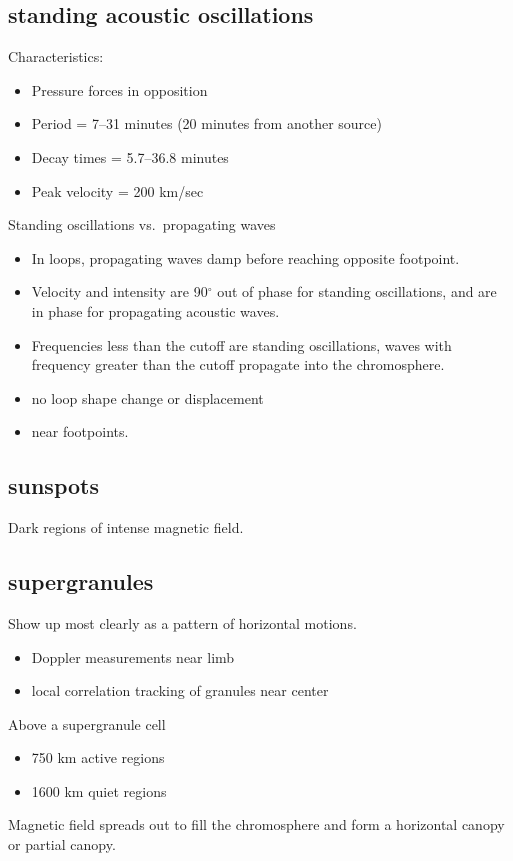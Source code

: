 \documentclass{article}
\begin{document}
\subsection{standing acoustic oscillations}
Characteristics:
\begin{itemize}
    \item Pressure forces in opposition
    \item Period = 7--31 minutes (20 minutes from another source)
    \item Decay times = 5.7--36.8 minutes
    \item Peak velocity = 200 km/sec
\end{itemize}
Standing oscillations vs.\ propagating waves
\begin{itemize}
    \item In loops, propagating waves damp before
        reaching opposite footpoint.
    \item Velocity and intensity are 90$^{\circ}$ out of phase
        for standing oscillations, and are in phase for propagating
        acoustic waves.
    \item Frequencies less than the cutoff are standing oscillations,
        waves with frequency greater than the cutoff propagate into
        the chromosphere.
    \item no loop shape change or displacement
    \item near footpoints.
\end{itemize}

\subsection{sunspots}
Dark regions of intense magnetic field.

\subsection{supergranules}
Show up most clearly as a pattern of horizontal motions.
\begin{itemize}
    \item Doppler measurements near limb
    \item local correlation tracking of granules near center
\end{itemize}
Above a supergranule cell
\begin{itemize}
    \item 750 km active regions
    \item 1600 km quiet regions
\end{itemize}
Magnetic field spreads out to fill the chromosphere and form a
horizontal canopy or partial canopy.
\end{document}
